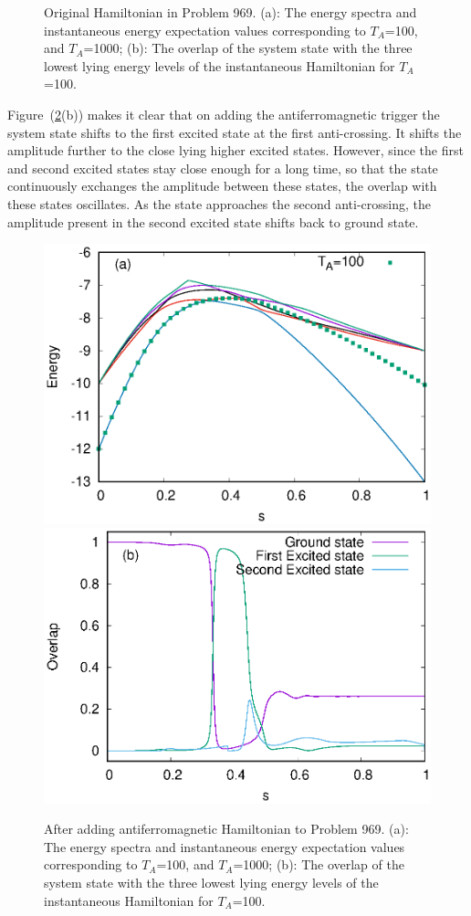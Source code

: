 \documentclass[../main.tex]{subfiles}
\begin{document}
\begin{itemize}
\begin{figure}
  \caption{Original Hamiltonian in Problem 969. (a): The energy spectra and instantaneous energy expectation values corresponding to $T_A$=100, and $T_A$=1000; (b): The overlap of the system state with the three lowest lying energy levels of the instantaneous Hamiltonian for $T_A$=100.}
    \label{fig:a47}
 \end{figure}

Figure~(\ref{fig:a49}(b)) makes it clear that on adding the antiferromagnetic trigger the system state shifts to the first excited state at the first anti-crossing. It shifts the amplitude further to the close lying higher excited states. However, since the first and second excited states stay close enough for a long time, so that the state continuously exchanges the amplitude between these states, the overlap with these states oscillates. As the state approaches the second anti-crossing, the amplitude present in the second excited state shifts back to ground state.
\begin{figure}
\centering
  \includegraphics[scale=0.8]{969_A_T100_g1.eps}
  \includegraphics[scale=0.8]{969_A_g1_Overlap.eps}
  \caption{After adding antiferromagnetic Hamiltonian to Problem 969. (a): The energy spectra and instantaneous energy expectation values corresponding to $T_A$=100, and $T_A$=1000; (b): The overlap of the system state with the three lowest lying energy levels of the instantaneous Hamiltonian for $T_A$=100.}
  \label{fig:a49}
 \end{figure}


\end{itemize}
\end{document}
